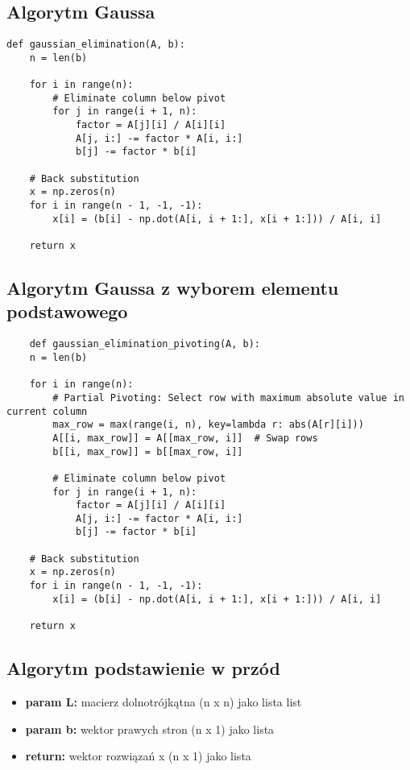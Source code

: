 \documentclass{article}
\begin{document}
\subsection{Algorytm Gaussa}
\begin{lstlisting}
def gaussian_elimination(A, b):
    n = len(b)
    
    for i in range(n):
        # Eliminate column below pivot
        for j in range(i + 1, n):
            factor = A[j][i] / A[i][i]
            A[j, i:] -= factor * A[i, i:]
            b[j] -= factor * b[i]
    
    # Back substitution
    x = np.zeros(n)
    for i in range(n - 1, -1, -1):
        x[i] = (b[i] - np.dot(A[i, i + 1:], x[i + 1:])) / A[i, i]
    
    return x
\end{lstlisting}

\subsection{Algorytm Gaussa z wyborem elementu podstawowego}
\begin{lstlisting}
    def gaussian_elimination_pivoting(A, b):
    n = len(b)
    
    for i in range(n):
        # Partial Pivoting: Select row with maximum absolute value in current column
        max_row = max(range(i, n), key=lambda r: abs(A[r][i]))
        A[[i, max_row]] = A[[max_row, i]]  # Swap rows
        b[[i, max_row]] = b[[max_row, i]]
        
        # Eliminate column below pivot
        for j in range(i + 1, n):
            factor = A[j][i] / A[i][i]
            A[j, i:] -= factor * A[i, i:]
            b[j] -= factor * b[i]
    
    # Back substitution
    x = np.zeros(n)
    for i in range(n - 1, -1, -1):
        x[i] = (b[i] - np.dot(A[i, i + 1:], x[i + 1:])) / A[i, i]
    
    return x
\end{lstlisting}
\subsection{Algorytm podstawienie w przód}
\begin{itemize}
    \item \textbf{param L:} macierz dolnotrójkątna (n x n) jako lista list
    \item \textbf{param b:} wektor prawych stron (n x 1) jako lista
    \item \textbf{return:} wektor rozwiązań x (n x 1) jako lista
\end{itemize}
\end{document}
